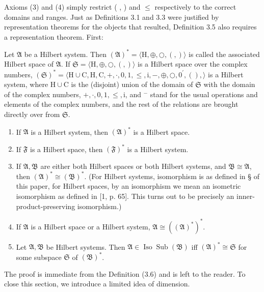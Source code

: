 \documentclass{article}
\begin{document}
{{{Axioms (3) and (4) simply restrict ( , ) and $\leq$ respectively to the correct domains and ranges. Just as Definitions 3.1 and 3.3 were justified by representation theorems for the objects that resulted, Definition 3.5 also requires a representation theorem. First:
\begin{definition}
Let $\mathfrak{A}$ be a Hilbert system. Then $(\mathfrak{A})^{*}=\langle\mathrm{H}, \oplus, \bigcirc,(,)\rangle$ is called the associated Hilbert space of $\mathfrak{A}$. If $\mathfrak{S}=\langle\mathrm{H}, \oplus, \bigcirc,(,)\rangle$ is a Hilbert space over the complex numbers, $(\mathfrak{S})^{*}=\langle\mathrm{H} \cup \mathrm{C}, \mathrm{H}, \mathrm{C},+, \cdot, 0,1, \leq, \mathrm{i},-, \oplus, \bigcirc, 0^{\prime},(), \rangle$ is a Hilbert system, where $\mathrm{H} \cup \mathrm{C}$ is the (disjoint) union of the domain of $\mathfrak{S}$ with the domain of the complex numbers, $+, \cdot, 0,1, \leq, \mathrm{i}$, and ${ }^{-}$ stand for the usual operations and elements of the complex numbers, and the rest of the relations are brought directly over from $\mathfrak{S}$.
\end{definition}
\begin{theorem}
\begin{enumerate}
\item If $\mathfrak{A}$ is a Hilbert system, then $(\mathfrak{A})^{*}$ is a Hilbert space.
\item If $\mathfrak{F}$ is a Hilbert space, then $(\mathfrak{F})^{*}$ is a Hilbert system.
\item If $\mathfrak{A}, \mathfrak{B}$ are either both Hilbert spaces or both Hilbert systems, and $\mathfrak{B} \cong \mathfrak{A}$, then $(\mathfrak{A})^{*} \cong (\mathfrak{B})^{*}$. (For Hilbert systems, isomorphism is as defined in § of this paper, for Hilbert spaces, by an isomorphism we mean an isometric isomorphism as defined in [1, p. 65]. This turns out to be precisely an inner-product-preserving isomorphism.)
\item If $\mathfrak{A}$ is a Hilbert space or a Hilbert system, $\mathfrak{A} \cong \left((\mathfrak{A})^{*}\right)^{*}$.
\item Let $\mathfrak{A}, \mathfrak{B}$ be Hilbert systems. Then $\mathfrak{A} \in \operatorname{Iso} \operatorname{Sub}(\mathfrak{B})$ iff $(\mathfrak{A})^{*} \cong \mathfrak{S}$ for some subspace $\mathfrak{S}$ of $(\mathfrak{B})^{*}$.
\end{enumerate}
\end{theorem}
The proof is immediate from the Definition (3.6) and is left to the reader. To close this section, we introduce a limited idea of dimension.
}}}
\end{document}
